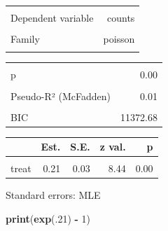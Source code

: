 \documentclass[
]{article}
\newenvironment{Shaded}{\begin{snugshade}}{\end{snugshade}}
\newcommand{\DecValTok}[1]{\textcolor[rgb]{0.00,0.00,0.81}{#1}}
\newcommand{\FunctionTok}[1]{\textcolor[rgb]{0.13,0.29,0.53}{\textbf{#1}}}
\newcommand{\NormalTok}[1]{#1}
\newcommand{\SpecialCharTok}[1]{\textcolor[rgb]{0.81,0.36,0.00}{\textbf{#1}}}
\begin{document}
\begin{table}[!h]
\centering
\begin{tabular}{lr}
\toprule
\cellcolor{gray!10}{Observations} & \cellcolor{gray!10}{252}\\
Dependent variable & counts\\
\cellcolor{gray!10}{Type} & \cellcolor{gray!10}{Generalized linear model}\\
Family & poisson\\
\cellcolor{gray!10}{Link} & \cellcolor{gray!10}{log}\\
\bottomrule
\end{tabular}
\end{table} \begin{table}[!h]
\centering
\begin{tabular}{lr}
\toprule
\cellcolor{gray!10}{$\chi^2$(1)} & \cellcolor{gray!10}{71.36}\\
p & 0.00\\
\cellcolor{gray!10}{Pseudo-R² (Cragg-Uhler)} & \cellcolor{gray!10}{0.25}\\
Pseudo-R² (McFadden) & 0.01\\
\cellcolor{gray!10}{AIC} & \cellcolor{gray!10}{11365.62}\\
\addlinespace
BIC & 11372.68\\
\bottomrule
\end{tabular}
\end{table} \begin{table}[!h]
\centering
\begin{threeparttable}
\begin{tabular}{lrrrr}
\toprule
  & Est. & S.E. & z val. & p\\
\midrule
\cellcolor{gray!10}{(Intercept)} & \cellcolor{gray!10}{3.12} & \cellcolor{gray!10}{0.02} & \cellcolor{gray!10}{171.74} & \cellcolor{gray!10}{0.00}\\
treat & 0.21 & 0.03 & 8.44 & 0.00\\
\bottomrule
\end{tabular}
\begin{tablenotes}
\item Standard errors: MLE
\end{tablenotes}
\end{threeparttable}
\end{table}

\begin{Shaded}
\begin{Highlighting}[]
\FunctionTok{print}\NormalTok{(}\FunctionTok{exp}\NormalTok{(.}\DecValTok{21}\NormalTok{) }\SpecialCharTok{{-}} \DecValTok{1}\NormalTok{)}
\end{Highlighting}
\end{Shaded}
\end{document}
